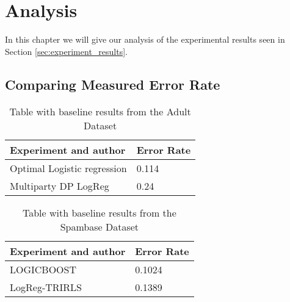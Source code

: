
\chapter{Analysis}
\label{ch:analysis}
In this chapter we will give our analysis of the experimental results seen in Section \ref{sec:experiment_results}.

\section{Comparing Measured Error Rate}

\begin{table}[h]
	\begin{tabularx}{\textwidth}{|X|l|}
		\textbf{Experiment and author}                                                 & \textbf{Error Rate}      \\
				\hline
		Optimal Logistic regression \citep{caruana2006empirical}   				       & 0.114 \\
		Multiparty DP LogReg \citep{pathak2010diffprivhomo}                            & 0.24 \\
	\end{tabularx}
	\caption{Table with baseline results from the Adult Dataset}
	\label{tab:baseline_class_results_adult}
\end{table}

\begin{table}[h]
	\begin{tabularx}{\textwidth}{|X|l|}
		\textbf{Experiment and author}                                             & \textbf{Error Rate}      \\
		\hline
		LOGICBOOST\citep{sharma2013adaptive}                                       & 0.1024 \\
		LogReg-TRIRLS\citep{kumar2012comparative}                                  & 0.1389 \\
	\end{tabularx}
	\caption{Table with baseline results from the Spambase Dataset}
	\label{tab:baseline_class_results_spambase}
\end{table}

